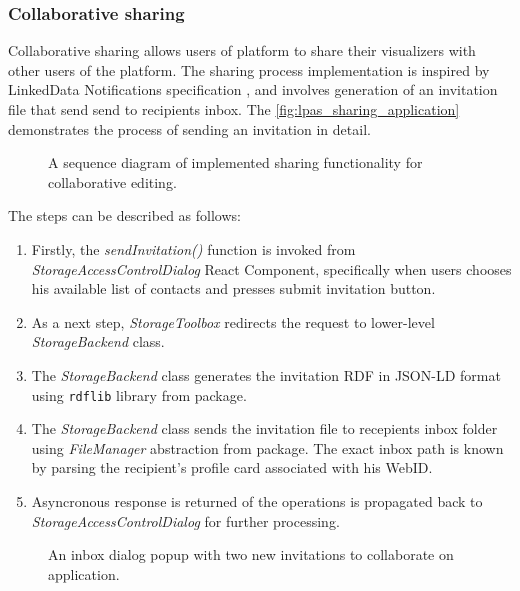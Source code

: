 \subsubsection{Collaborative sharing}

Collaborative sharing allows users of \lpa{} platform to share their visualizers with other users of the platform. The sharing process implementation is inspired by LinkedData Notifications specification , and involves generation of an invitation file that send send to recipients inbox. The \autoref{fig:lpas_sharing_application} demonstrates the process of sending an invitation in detail.

\begin{figure}[h]
\centering
{}
\caption{A sequence diagram of implemented sharing functionality for collaborative editing.}
\label{fig:lpas_sharing_application}
\end{figure}
  
The steps can be described as follows:
\begin{enumerate}
	\item Firstly, the \textit{sendInvitation()} function is invoked from \textit{StorageAccessControlDialog} React Component, specifically when users chooses his available list of contacts and presses submit invitation button.
	\item As a next step, \textit{StorageToolbox} redirects the request to lower-level \textit{StorageBackend} class.
	\item The \textit{StorageBackend} class generates the invitation RDF in JSON-LD format using \texttt{rdflib} library from \lpas{} package.
	\item The \textit{StorageBackend} class sends the invitation file to recepients inbox folder using \textit{FileManager} abstraction from \lpas{} package. The exact inbox path is known by parsing the recipient's profile card associated with his WebID.
	\item Asyncronous response is returned of the operations is propagated back to \textit{StorageAccessControlDialog} for further processing. 
\end{enumerate}
 
\begin{figure}[h]
\centering
{}
\caption{An inbox dialog popup with two new invitations to collaborate on application.}
\label{fig:lpa_inbox_with_invitations}
\end{figure}
  
